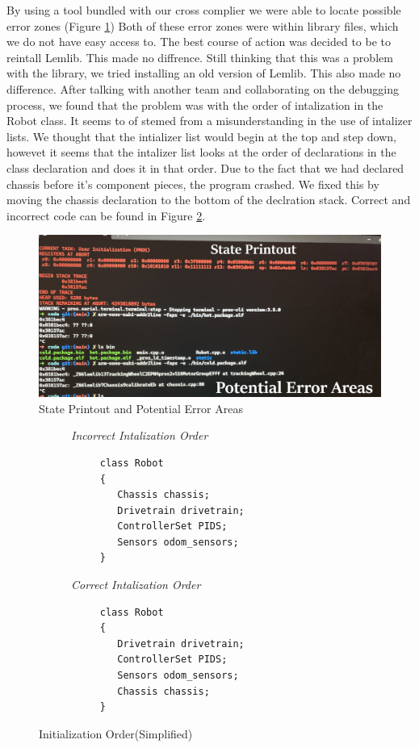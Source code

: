 \documentclass[12pt]{article}
\begin{document}
By using a tool bundled with our cross complier we were able to locate possible error zones (Figure \ref{FIG::statePrint})
Both of these error zones were within library files, which we do not have easy access to.
The best course of action was decided to be to reintall Lemlib. This made no diffrence.
Still thinking that this was a problem with the library, we tried installing an old version of Lemlib. This also made no difference.
After talking with another team and collaborating on the debugging process, we found that the problem was with the order of intalization in the Robot class. It seems to of stemed from a misunderstanding in the use of intalizer lists.
We thought that the intializer list would begin at the top and step down, howevet it seems that
the intalizer list looks at the order of declarations in the class declaration and does it in that order. Due to the fact that we had declared chassis before it's component pieces, the program crashed. We fixed this by moving the chassis declaration to the bottom of the declration stack.
Correct and incorrect code can be found in Figure \ref{CODE::initOrderSimp}.
\begin{figure}
 \centering
 \caption{State Printout and Potential Error Areas}
 \label{FIG::statePrint}
 \includegraphics[scale=0.1]{statePrint}
\end{figure}

\pagebreak
\begin{figure}
\begin{subfigure}{0.5\textwidth}

\textit{Incorrect Intalization Order}
\begin{verbatim}
     class Robot
     {
        Chassis chassis;
        Drivetrain drivetrain;
        ControllerSet PIDS;
        Sensors odom_sensors;
     }
\end{verbatim}
\end{subfigure}%
\begin{subfigure}{0.5\textwidth}
\textit{Correct Intalization Order}
\begin{verbatim}
     class Robot
     {
        Drivetrain drivetrain;
        ControllerSet PIDS;
        Sensors odom_sensors;
        Chassis chassis;
     }

\end{verbatim}
\end{subfigure}
\caption{Initialization Order(Simplified)}
\label{CODE::initOrderSimp}
\end{figure}
\end{document}
